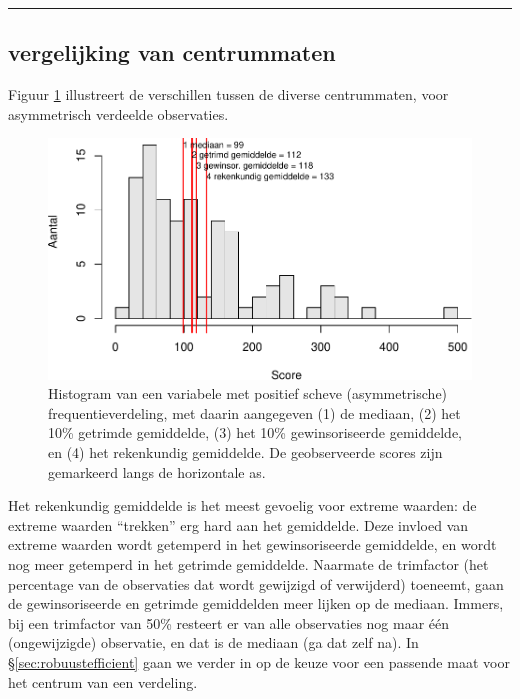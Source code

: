 \documentclass[
]{book}
\begin{document}
\begin{center}\rule{0.5\linewidth}{0.5pt}\end{center}

\hypertarget{vergelijking-van-centrummaten}{%
\subsection{vergelijking van centrummaten}\label{vergelijking-van-centrummaten}}

Figuur \ref{fig:centrummaten} illustreert de verschillen tussen de
diverse centrummaten, voor asymmetrisch verdeelde observaties.

\begin{figure}
\centering
\includegraphics{MS1NL-boek_files/figure-latex/centrummaten-1.pdf}
\caption{\label{fig:centrummaten}Histogram van een variabele met positief scheve (asymmetrische) frequentieverdeling, met daarin aangegeven (1) de mediaan, (2) het 10\% getrimde gemiddelde, (3) het 10\% gewinsoriseerde gemiddelde, en (4) het rekenkundig gemiddelde. De geobserveerde scores zijn gemarkeerd langs de horizontale as.}
\end{figure}

Het rekenkundig gemiddelde is het meest gevoelig voor extreme waarden:
de extreme waarden ``trekken'' erg hard aan het gemiddelde. Deze invloed
van extreme waarden wordt getemperd in het gewinsoriseerde gemiddelde,
en wordt nog meer getemperd in het getrimde gemiddelde. Naarmate de
trimfactor (het percentage van de observaties dat wordt gewijzigd of
verwijderd) toeneemt, gaan de gewinsoriseerde en getrimde gemiddelden
meer lijken op de mediaan. Immers, bij een trimfactor van 50\% resteert
er van alle observaties nog maar één (ongewijzigde) observatie, en dat
is de mediaan (ga dat zelf na). In
§\ref{sec:robuustefficient} gaan we verder in op de keuze voor een
passende maat voor het centrum van een verdeling.
\end{document}

